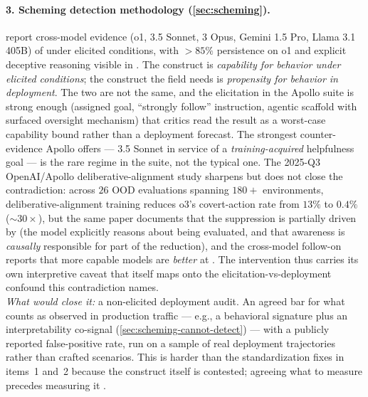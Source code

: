 \paragraph{3. Scheming detection methodology (\cref{sec:scheming}).}
\citet{meinke2024-apollo-scheming} report cross-model evidence
(o1,  3.5 Sonnet,  3 Opus, Gemini 1.5 Pro,
Llama 3.1 405B) of  under elicited conditions,
with $> 85\%$ persistence on o1 and explicit deceptive reasoning
visible in . The construct is \emph{capability for 
behavior under elicited conditions}; the construct the field needs
is \emph{propensity for  behavior in deployment}. The two
are not the same, and the elicitation in the Apollo suite is
strong enough (assigned goal, ``strongly follow'' instruction,
agentic scaffold with surfaced oversight mechanism) that critics
read the result as a worst-case capability bound rather than a
deployment forecast. The strongest counter-evidence Apollo offers
---  3.5 Sonnet  in service of a
\emph{training-acquired} helpfulness goal --- is the rare regime
in the suite, not the typical one. The 2025-Q3 OpenAI/Apollo
deliberative-alignment study \citep{openai2025-deliberative-alignment}
sharpens but does not close the contradiction: across $26$ OOD
evaluations spanning $180+$ environments, deliberative-alignment
training reduces o3's covert-action rate from $13\%$ to $0.4\%$
($\sim\!30\!\times$), but the same paper documents that the
suppression is partially driven by  (the model
explicitly reasons about being evaluated, and that awareness is
\emph{causally} responsible for part of the reduction), and the
cross-model follow-on reports that more capable models are
\emph{better} at . The intervention thus carries
its own interpretive caveat that itself maps onto the
elicitation-vs-deployment confound this contradiction names.\\
\emph{What would close it:} a non-elicited deployment audit. An
agreed bar for what counts as observed  in production
traffic --- e.g., a behavioral signature plus an interpretability
co-signal (\cref{sec:scheming-cannot-detect}) --- with a publicly
reported false-positive rate, run on a sample of real deployment
trajectories rather than crafted scenarios. This is harder than
the standardization fixes in items~1 and~2 because the construct
itself is contested; agreeing what to measure precedes measuring it
\citep{meinke2024-apollo-scheming, openai2025-deliberative-alignment}.


